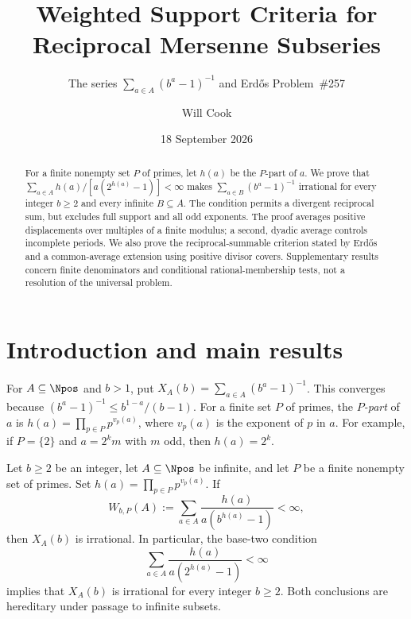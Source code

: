 \documentclass[11pt]{article}
\title{Weighted Support Criteria for Reciprocal Mersenne Subseries}
\subtitle{The series $\sum_{a\in A}(b^a-1)^{-1}$ and Erd\H{o}s Problem~\#257}
\author{Will Cook}
\date{18 September 2026}
\begin{document}
\maketitle
\noteprovenance
\begin{abstract}
For a finite nonempty set $P$ of primes, let $h(a)$ be the $P$-part of $a$.
We prove that $\sum_{a\in A}h(a)/[a(2^{h(a)}-1)]<\infty$ makes
$\sum_{a\in B}(b^a-1)^{-1}$ irrational for every integer $b\ge2$ and every
infinite $B\subseteq A$.  The condition permits a divergent reciprocal
sum, but excludes full support and all odd exponents.  The proof averages
positive displacements over multiples of a finite modulus; a second,
dyadic average controls incomplete periods.  We also prove the
reciprocal-summable criterion stated by Erd\H{o}s and a common-average
extension using positive divisor covers.  Supplementary results concern
finite denominators and conditional rational-membership tests, not a
resolution of the universal problem.

\end{abstract}

\section{Introduction and main results}\label{sec:problem}
For $A\subseteq\Npos$ and $b>1$, put
$X_A(b)=\sum_{a\in A}(b^a-1)^{-1}$.  This converges because
$(b^a-1)^{-1}\le b^{1-a}/(b-1)$.  For a finite set $P$ of primes,
the \emph{$P$-part} of $a$ is $h(a)=\prod_{p\in P}p^{v_p(a)}$, where
$v_p(a)$ is the exponent of $p$ in $a$.  For example, if $P=\{2\}$
and $a=2^km$ with $m$ odd, then $h(a)=2^k$.

\begin{theorem}
\label{res:weighted-support}
Let $b\ge2$ be an integer, let $A\subseteq\Npos$ be infinite, and let $P$
be a finite nonempty set of primes.  Set
$h(a)=\prod_{p\in P}p^{v_p(a)}$.  If
\begin{equation}\label{eq:weighted-fixed-base}
 W_{b,P}(A):=\sum_{a\in A}
 \frac{h(a)}{a(b^{h(a)}-1)}<\infty,
\end{equation}
then $X_A(b)$ is irrational.  In particular, the base-two condition
\begin{equation*}\label{eq:weighted-return}
 \sum_{a\in A}\frac{h(a)}{a(2^{h(a)}-1)}<\infty
 \tag{W}
\end{equation*}
implies that $X_A(b)$ is irrational for every integer $b\ge2$.  Both
conclusions are hereditary under passage to infinite subsets.
\end{theorem}
\end{document}
